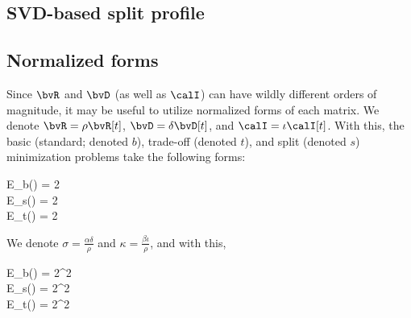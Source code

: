 \subsection{SVD-based split profile}

{\color{red} \lipsum[1]}

\subsection{Normalized forms}

Since $\bvR$ and $\bvD$ (as well as $\calI$) can have wildly different orders of magnitude, it may be useful to utilize normalized forms of each matrix. We denote $\bvR = \rho \bvR[t]$, $\bvD = \delta \bvD[t]$, and $\calI = \iota \calI[t]$. With this, the basic (standard; denoted $b$), trade-off (denoted $t$), and split (denoted $s$) minimization problems take the following forms:
\begin{subgather}
	\nabla E_b(\bvs) = 2 \\
	\nabla E_s() = 2 \\
	\nabla E_t(\bvs) = 2\pts{ \bts{ \rho^2 \bvR[tT] \bvR[t] + \alpha^2 \delta^2 \bvD[tT] \bvD[t] + \beta^2 \iota^2 \calI[tT] \calI[t] } \bvs - \bts{\rho \bvR[tT] \bvt{\obs} + \beta^2 \iota^2 \calI[tT] \calI[t] \bvs{\obs}} }
\end{subgather}

We denote $\sigma = \frac{\alpha\delta}{\rho}$ and $\kappa = \frac{\beta\iota}{\rho}$, and with this,
\begin{subgather}
	\nabla E_b(\bvs) = 2\rho^2  \\
	\nabla E_s() = 2\rho^2  \\
	\nabla E_t(\bvs) = 2\rho^2 
\end{subgather}

